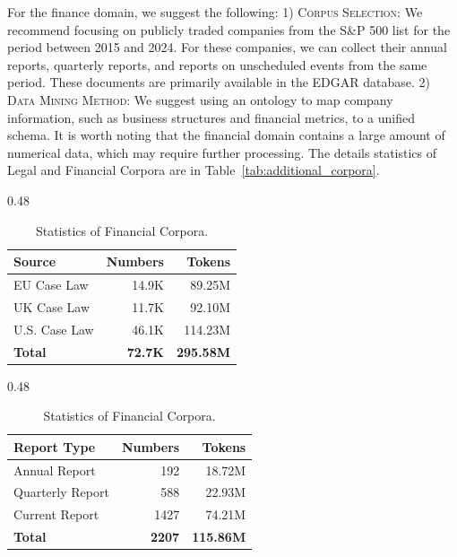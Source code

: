 \documentclass{article} %
\begin{document}
For the finance domain, we suggest the following: 1) \textsc{Corpus Selection}: We recommend focusing on publicly traded companies from the S\&P 500 list for the period between 2015 and 2024. For these companies, we can collect their annual reports, quarterly reports, and reports on unscheduled events from the same period. These documents are primarily available in the EDGAR database. 2) \textsc{Data Mining Method}: We suggest using an ontology to map company information, such as business structures and financial metrics, to a unified schema. It is worth noting that the financial domain contains a large amount of numerical data, which may require further processing. The details statistics of Legal and Financial Corpora are in Table~\ref{tab:additional_corpora}.

\begin{table}[ht]
\centering
\small
\caption{Statistics of Legal and Financial Corpora.}
\label{tab:additional_corpora}

\begin{subtable}{0.48\textwidth}
    \centering
    \label{tab:case_law}
    \begin{tabular}{lrr}
    \toprule
    \textbf{Source}      & \textbf{Numbers} & \textbf{Tokens} \\ 
    \midrule
    EU Case Law          & 14.9K                        & 89.25M          \\
    UK Case Law          & 11.7K                        & 92.10M          \\
    U.S. Case Law        & 46.1K                        & 114.23M         \\ 
    \midrule
    \textbf{Total}       & \textbf{72.7K}               & \textbf{295.58M}        \\ 
    \bottomrule
    \end{tabular}
    \vspace{1mm}
    \caption{Statistics of Legal Corpora.}

\end{subtable}
\hfill 
\begin{subtable}{0.48\textwidth}
    \centering
    \label{tab:sec_reports}
    \begin{tabular}{lrr}
    \toprule
    \textbf{Report Type} & \textbf{Numbers} & \textbf{Tokens} \\ 
    \midrule
    Annual Report        & 192                        & 18.72M          \\
    Quarterly Report     & 588                        & 22.93M          \\
    Current Report       & 1427                       & 74.21M          \\ 
    \midrule
    \textbf{Total}       & \textbf{2207}              & \textbf{115.86M}        \\ 
    \bottomrule
    \end{tabular}
    \vspace{1mm}
    \caption{Statistics of Financial Corpora.}
\end{subtable}
\end{table}
\end{document}
